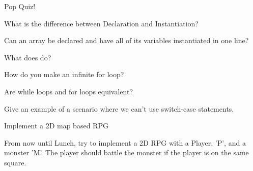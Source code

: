 \begin{frame}{Pop Quiz!}
\begin{center}
What is the difference between Declaration and Instantiation?\\  \pause

Can an array be declared and have all of its variables instantiated in one line?\\  \pause

What does \texttt{} do?\\  \pause

How do you make an infinite for loop?\\  \pause

Are while loops and for loops equivalent?\\  \pause

Give an example of a scenario where we can't use switch-case statements.

\end{center}
\end{frame}

\begin{frame}{Implement a 2D map based RPG}

\begin{center}
From now until Lunch, try to implement a 2D RPG with a Player, 'P', and a monster 'M'. The player should battle the monster if the player is on the same square.
\end{center}
\end{frame}
